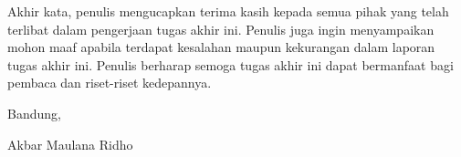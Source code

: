 Akhir kata, penulis mengucapkan terima kasih kepada semua pihak yang telah terlibat dalam pengerjaan tugas akhir ini. Penulis juga ingin menyampaikan mohon maaf apabila terdapat kesalahan maupun kekurangan dalam laporan tugas akhir ini. Penulis berharap semoga tugas akhir ini dapat bermanfaat bagi pembaca dan riset-riset kedepannya.

\begin{flushright}
  \vspace{0.5cm}
  Bandung, \tanggalpengesahan


  \vspace{1.5cm}

  Akbar Maulana Ridho
\end{flushright}